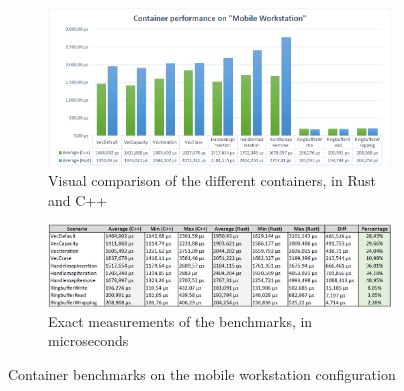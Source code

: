\begin{figure}[h!]
	\centering
	\begin{subfigure}[b]{\textwidth}
		\includegraphics[width=1\linewidth]{PICs/container_bench_workstation.png}
		\caption{Visual comparison of the different containers, in Rust and C++}
		\label{fig:cont_bench_work} 
	\end{subfigure}
	
	\begin{subfigure}[b]{\textwidth}
		\includegraphics[width=1\linewidth]{PICs/container_bench_workstation_data.png}
		\caption{Exact measurements of the benchmarks, in microseconds}
		\label{fig:cont_bench_blade}
	\end{subfigure}
	
	\caption[Container benchmarks workstation]{Container benchmarks on the mobile workstation configuration}
\end{figure}

\clearpage

